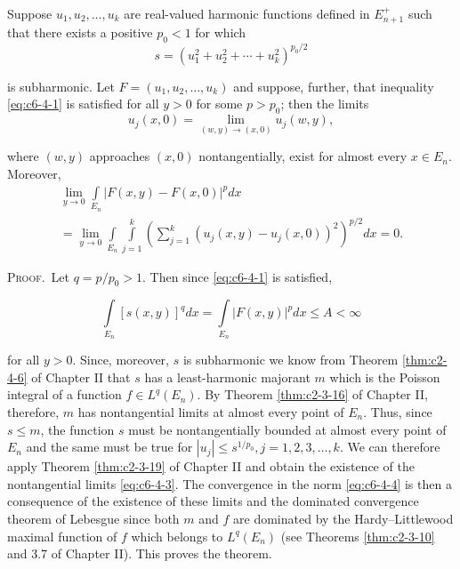 \begin{theorem}
\label{thm:c6-4-2}
Suppose $u_1, u_2, \ldots, u_k$ are real-valued harmonic functions defined in $E_{n+1}^+$ such that there exists a positive $p_0 < 1$ for which
\[
s=(u_{1}^{2}+u_{2}^{2}+\cdots+u_{k}^{2})^{p_{0}/2}
\]

is subharmonic. Let $F = (u_1, u_2, \ldots, u_k)$ and suppose, further, that inequality \eqref{eq:c6-4-1} is satisfied for all $y > 0$ for some $p > p_0$; then the limits
\begin{equation}\label{eq:c6-4-3}
u_{j}(x,0)=\lim\limits_{(w,y)\to(x,0)}u_{j}(w,y),
\end{equation}

where $(w, y)$ approaches $(x, 0)$ nontangentially, exist for almost every $x \in E_n$. Moreover,
\begin{equation}\label{eq:c6-4-4}
\begin{aligned}\lim_{y\to0}\int\limits_{E_{n}}|F(x,y)-F(x,0)|^{p} dx\\=\lim_{y\to0}\int\limits_{E_{n}}\int\limits_{j=1}^{k}\left(\sum_{j=1}^{k}(u_{j}(x,y)-u_{j}(x,0))^{2}\right)^{p/2}dx=0.\end{aligned}
\end{equation}

\end{theorem}

\textsc{Proof.}\ Let $q = p/p_0 > 1$. Then since \eqref{eq:c6-4-1} is satisfied,

\[
\int\limits_{E_{n}}[s(x,y)]^{q} dx=\int\limits_{E_{n}}|F(x,y)|^{p} dx\leq A<\infty
\]

for all $y > 0$. Since, moreover, $s$ is subharmonic we know from Theorem \ref{thm:c2-4-6} of Chapter II that $s$ has a least-harmonic majorant $m$ which is the Poisson integral of a function $f \in L^q(E_n)$. By Theorem \ref{thm:c2-3-16} of Chapter II, therefore, $m$ has nontangential limits at almost every point of $E_n$. Thus, since $s \leq m$, the function $s$ must be nontangentially bounded at almost every point of $E_n$ and the same must be true for $|u_j| \leq s^{1/p_0}, j = 1, 2, 3, \ldots, k$. We can therefore apply Theorem \ref{thm:c2-3-19} of Chapter II and obtain the existence of the nontangential limits \eqref{eq:c6-4-3}. The convergence in the norm \eqref{eq:c6-4-4} is then a consequence of the existence of these limits and the dominated convergence theorem of Lebesgue since both $m$ and $f$ are dominated by the Hardy--Littlewood maximal function of $f$ which belongs to $L^q(E_n)$ (see Theorems \ref{thm:c2-3-10} and 3.7 of Chapter II). This proves the theorem.

